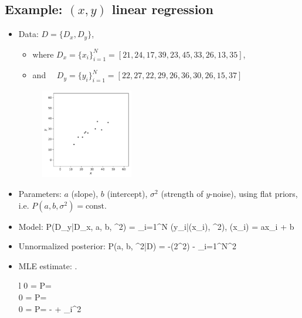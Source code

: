 \subsection{Example: $(x,y)$ linear regression}
\begin{itemize}
	\item Data: $D = \{D_x, D_y\}$, 
	\begin{itemize}
		\item where $D_x = \{x_i\}_{i=1}^N = [21, 24, 17, 39, 23, 45, 33, 26, 13, 35]$, 
		\item and $\quad D_y = \{y_i\}_{i=1}^N = [22, 27, 22, 29, 26, 36, 30, 26, 15, 37]$
	\end{itemize}
	\begin{figure}[h]
	\centering
		\includegraphics[width=0.38\textwidth]{./figs/06-data.pdf}
\end{figure}
	\item Parameters: $a$ (slope), $b$ (intercept), $\sigma^2$ (strength of $y$-noise), using flat priors, i.e. $P(a, b, \sigma^2) = \text{const.}$
	\item Model:
		\be
			P(D_y\;|\;D_x, a, b, \sigma^2) = \prod_{i=1}^N (y_i\;|\;\mu(x_i), \sigma^2),\qquad {} \mu(x_i) = ax_i + b
		\ee
	\item Unnormalized posterior:
		\be
			\log P\s(a, b, \sigma^2\;|\;D) = -\log(2\pi \sigma^2) - \sum_{i=1}^N\Big[y_i - (ax_i + b)\Big]^2
		\ee
	\item MLE estimate:
		\be
			\left.
				\begin{array}{l}
				0 =  \log P\s = 
				\\
				0 =  \log P\s = 
				\\
				0 =  \log P\s = - +  \sum_i\Big[y_i - (ax_i + b)\Big]^2
				\end{array}

\end{itemize}
